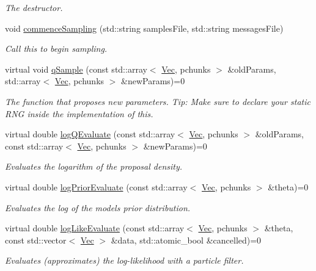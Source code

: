 \begin{DoxyCompactItemize}
\begin{DoxyCompactList}\small\item\em The destructor. \end{DoxyCompactList}\item 
void \hyperlink{classPmmh_afa1bca7b86289c35cf2be286c4372a2d}{commence\+Sampling} (std\+::string samples\+File, std\+::string messages\+File)
\begin{DoxyCompactList}\small\item\em Call this to begin sampling. \end{DoxyCompactList}\item 
virtual void \hyperlink{classPmmh_ae8825656a35923ee1228eed5a98f61f5}{q\+Sample} (const std\+::array$<$ \hyperlink{apf__filter_8h_a4c7df05c6f5e8a0d15ae14bcdbc07152}{Vec}, pchunks $>$ \&old\+Params, std\+::array$<$ \hyperlink{apf__filter_8h_a4c7df05c6f5e8a0d15ae14bcdbc07152}{Vec}, pchunks $>$ \&new\+Params)=0
\begin{DoxyCompactList}\small\item\em The function that proposes new parameters. Tip\+: Make sure to declare your static R\+NG inside the implementation of this. \end{DoxyCompactList}\item 
virtual double \hyperlink{classPmmh_accf63443ea773599b4195d7def98534a}{log\+Q\+Evaluate} (const std\+::array$<$ \hyperlink{apf__filter_8h_a4c7df05c6f5e8a0d15ae14bcdbc07152}{Vec}, pchunks $>$ \&old\+Params, const std\+::array$<$ \hyperlink{apf__filter_8h_a4c7df05c6f5e8a0d15ae14bcdbc07152}{Vec}, pchunks $>$ \&new\+Params)=0
\begin{DoxyCompactList}\small\item\em Evaluates the logarithm of the proposal density. \end{DoxyCompactList}\item 
virtual double \hyperlink{classPmmh_a2da524ce8dc4f7984bd2a84749862365}{log\+Prior\+Evaluate} (const std\+::array$<$ \hyperlink{apf__filter_8h_a4c7df05c6f5e8a0d15ae14bcdbc07152}{Vec}, pchunks $>$ \&theta)=0
\begin{DoxyCompactList}\small\item\em Evaluates the log of the model\textquotesingle{}s prior distribution. \end{DoxyCompactList}\item 
virtual double \hyperlink{classPmmh_aa521d90ee94e3ee8eea7dd33ed1603b3}{log\+Like\+Evaluate} (const std\+::array$<$ \hyperlink{apf__filter_8h_a4c7df05c6f5e8a0d15ae14bcdbc07152}{Vec}, pchunks $>$ \&theta, const std\+::vector$<$ \hyperlink{apf__filter_8h_a4c7df05c6f5e8a0d15ae14bcdbc07152}{Vec} $>$ \&data, std\+::atomic\+\_\+bool \&cancelled)=0
\begin{DoxyCompactList}\small\item\em Evaluates (approximates) the log-\/likelihood with a particle filter. \end{DoxyCompactList}\end{DoxyCompactItemize}


